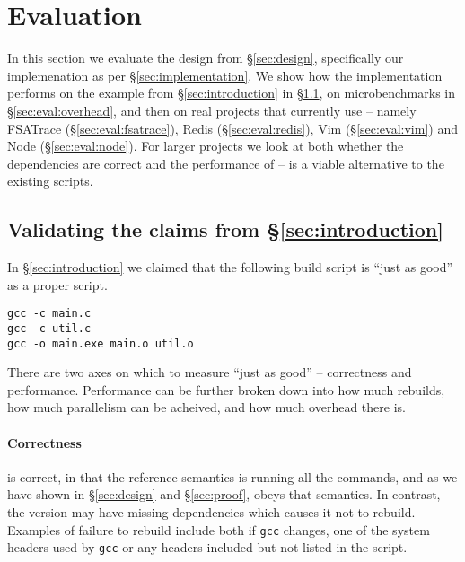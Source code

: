 \section{Evaluation}
\label{sec:evaluation}

In this section we evaluate the design from \S\ref{sec:design}, specifically our implemenation as per \S\ref{sec:implementation}. We show how the implementation performs on the example from \S\ref{sec:introduction} in \S\ref{sec:eval:introduction}, on microbenchmarks in \S\ref{sec:eval:overhead}, and then on real projects that currently use \Make -- namely FSATrace (\S\ref{sec:eval:fsatrace}), Redis (\S\ref{sec:eval:redis}), Vim (\S\ref{sec:eval:vim}) and Node (\S\ref{sec:eval:node}). For larger projects we look at both whether the dependencies are correct and the performance of \Rattle -- is \Rattle a viable alternative to the existing \Make scripts.

\subsection{Validating the claims from \S\ref{sec:introduction}}
\label{sec:eval:introduction}

In \S\ref{sec:introduction} we claimed that the following build script is ``just as good'' as a proper \Make script.

\begin{verbatim}
gcc -c main.c
gcc -c util.c
gcc -o main.exe main.o util.o
\end{verbatim}

There are two axes on which to measure ``just as good'' -- correctness and performance. Performance can be further broken down into how much rebuilds, how much parallelism can be acheived, and how much overhead there is.

\paragraph{Correctness} \Rattle is correct, in that the reference semantics is running all the commands, and as we have shown in \S\ref{sec:design} and \S\ref{sec:proof}, \Rattle obeys that semantics. In contrast, the \Make version may have missing dependencies which causes it not to rebuild. Examples of failure to rebuild include both if \texttt{gcc} changes, one of the system headers used by \texttt{gcc} or any headers included but not listed in the \Make script.

